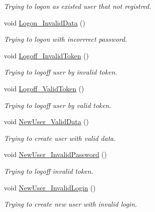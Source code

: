 \begin{DoxyCompactItemize}
\begin{DoxyCompactList}\small\item\em Trying to logon as existed user that not registred. \end{DoxyCompactList}\item 
void \mbox{\hyperlink{class_authority_controller_1_1_tests_1_1_queries_ac861fb620f063f0808c662d6a7eafeb2}{Logon\+\_\+\+Invalid\+Data}} ()
\begin{DoxyCompactList}\small\item\em Trying to logon with incorrrect password. \end{DoxyCompactList}\item 
void \mbox{\hyperlink{class_authority_controller_1_1_tests_1_1_queries_a4bae91492fae911ec7b5972e5f06e69a}{Logoff\+\_\+\+Invalid\+Token}} ()
\begin{DoxyCompactList}\small\item\em Trying to logoff user by invalid token. \end{DoxyCompactList}\item 
void \mbox{\hyperlink{class_authority_controller_1_1_tests_1_1_queries_a55ed45de5483ce80be47a31751b582f6}{Logoff\+\_\+\+Valid\+Token}} ()
\begin{DoxyCompactList}\small\item\em Trying to logoff user by valid token. \end{DoxyCompactList}\item 
void \mbox{\hyperlink{class_authority_controller_1_1_tests_1_1_queries_a8aa2995781a0353dbdf041871ab50458}{New\+User\+\_\+\+Valid\+Data}} ()
\begin{DoxyCompactList}\small\item\em Trying to create user with valid data. \end{DoxyCompactList}\item 
void \mbox{\hyperlink{class_authority_controller_1_1_tests_1_1_queries_a2ce7ef859f6c5b9441eb8b4aa5335a08}{New\+User\+\_\+\+Invalid\+Password}} ()
\begin{DoxyCompactList}\small\item\em Trying to logoff invalid token. \end{DoxyCompactList}\item 
void \mbox{\hyperlink{class_authority_controller_1_1_tests_1_1_queries_a17edb1eefd72cf95eb808d6c2fd888e2}{New\+User\+\_\+\+Invalid\+Login}} ()
\begin{DoxyCompactList}\small\item\em Trying to create new user with invalid login. \end{DoxyCompactList}\item 

\end{DoxyCompactItemize}
